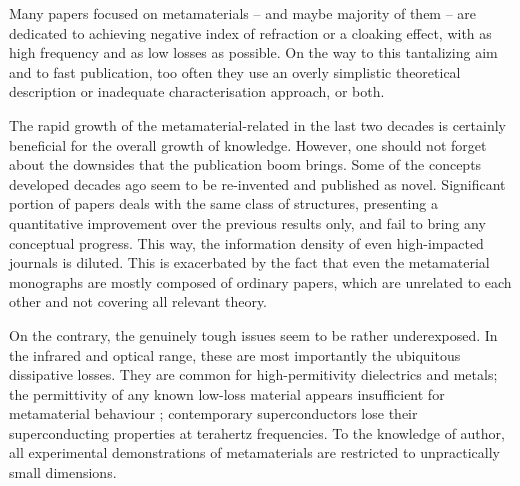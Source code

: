 Many papers focused on metamaterials -- and maybe majority of them -- are dedicated to achieving negative index of refraction or a cloaking effect, with as high frequency and as low losses as possible.
On the way to this tantalizing aim and to fast publication, too often they use an overly simplistic theoretical description or inadequate characterisation approach, or both. %

The rapid growth of the metamaterial-related in the last two decades is certainly beneficial for the overall growth of knowledge. However, one should not forget about the downsides that the publication boom brings. Some of the concepts developed decades ago seem to be re-invented and published as novel. Significant portion of papers deals with the same class of structures, presenting a quantitative improvement over the previous results only, and fail to bring any conceptual progress. This way, the information density of even high-impacted journals is diluted. This is exacerbated by the fact that even the metamaterial monographs are mostly composed of ordinary papers, which are unrelated to each other and not covering all relevant theory.

On the contrary, the genuinely tough issues seem to be rather underexposed. In the infrared and optical range, these are most importantly the ubiquitous dissipative losses. They are common for high-permitivity dielectrics and metals; the permittivity of any known low-loss material appears insufficient for metamaterial behaviour \cite{dominec2014transition}; contemporary superconductors lose their superconducting properties at terahertz frequencies. To the knowledge of author, all experimental demonstrations of metamaterials are restricted to unpractically small dimensions. 
%

